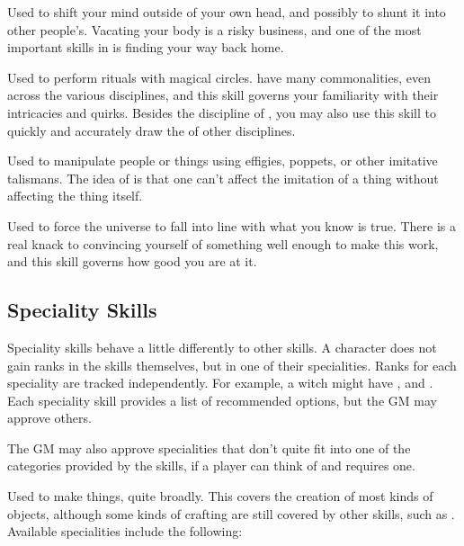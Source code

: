 
Used to shift your mind outside of your own head, and possibly to shunt it into other people's.
Vacating your body is a risky business, and one of the most important skills in  is finding your way back home.


Used to perform rituals with magical circles.
 have many commonalities, even across the various disciplines, and this skill governs your familiarity with their intricacies and quirks.
Besides the discipline of , you may also use this skill to quickly and accurately draw the  of other disciplines.


Used to manipulate people or things using effigies, poppets, or other imitative talismans.
The idea of  is that one can't affect the imitation of a thing without affecting the thing itself.


Used to force the universe to fall into line with what you know is true.
There is a real knack to convincing yourself of something well enough to make this work, and this skill governs how good you are at it.

\subsection{Speciality Skills}

Speciality skills behave a little differently to other skills.
A character does not gain ranks in the skills themselves, but in one of their specialities.
Ranks for each speciality are tracked independently.
For example, a witch might have ,  and .
Each speciality skill provides a list of recommended options, but the GM may approve others.

The GM may also approve specialities that don't quite fit into one of the categories provided by the skills, if a player can think of and requires one.


Used to make things, quite broadly.
This covers the creation of most kinds of objects, although some kinds of crafting are still covered by other skills, such as .
Available specialities include the following:

